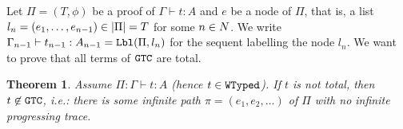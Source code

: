 \documentclass{article}
\newtheorem{theorem}{Theorem}[section]
\begin{document}

Let $\Pi=(T,\phi)$ be a proof of $\Gamma\vdash t:A$ and $e$ be a node of $\Pi$, that is, a list  
$l_n=(e_1, \ldots, e_{n-1}) \in {|\Pi|} = T$ for some $n \in {N}$.
We write $\Gamma_{n-1}\vdash t_{n-1}:A_{n-1} = {\tt Lbl}(\Pi,l_n)$ for the sequent
 labelling the node $l_n$. We want to prove that all terms of ${\tt GTC}$ are total.

\begin{theorem}
  Assume $\Pi:\Gamma\vdash t:A$ (hence $t\in {\tt WTyped}$).
  If $t$ is \emph{not} total, then $t \not \in {\tt GTC}$, i.e.:
  there is some infinite path $\pi = (e_1, e_2, \ldots)$ of $\Pi$ with no infinite progressing trace. 
\end{theorem}

\end{document}
